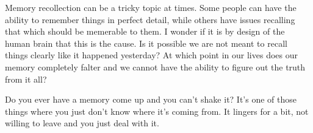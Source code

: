 Memory recollection can be a tricky topic at times. Some people can have the ability
to remember things in perfect detail, while others have issues recalling that which
should be memerable to them. I wonder if it is by design of the human brain that this
is the cause. Is it possible we are not meant to recall things clearly like it
happened yesterday? At which point in our lives does our memory completely falter and
we cannot have the ability to figure out the truth from it all?

Do you ever have a memory come up and you can't shake it? It's one of those things
where you just don't know where it's coming from. It lingers for a bit, not willing
to leave and you just deal with it.